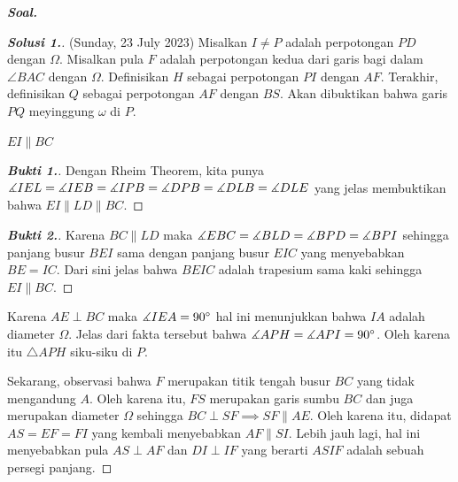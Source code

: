 \textbf{\textit{Soal. }}

\begin{proof}[\textbf{Solusi 1.}] (Sunday, 23 July 2023)
    Misalkan $I \neq P$ adalah perpotongan $PD$ dengan $\Omega$. Misalkan pula $F$ adalah perpotongan kedua dari garis bagi dalam $\angle BAC$ dengan $\Omega$. Definisikan $H$ sebagai perpotongan $PI$ dengan $AF$. Terakhir, definisikan $Q$ sebagai perpotongan $AF$ dengan $BS$. Akan dibuktikan bahwa garis $PQ$ meyinggung $\omega$ di $P$. 

    
    \begin{lemmarev}
        $EI \parallel BC$ 
        \begin{proof}[\textbf{Bukti 1.}] Dengan Rheim Theorem, kita punya $\measuredangle IEL = \measuredangle IEB = \measuredangle IPB = \measuredangle DPB = \measuredangle DLB = \measuredangle DLE$ yang jelas membuktikan bahwa $EI \parallel LD \parallel BC$.
        \end{proof}
        \begin{proof}[\textbf{Bukti 2.}] Karena $BC \parallel LD$ maka $\measuredangle EBC = \measuredangle BLD = \measuredangle BPD = \measuredangle BPI$ sehingga panjang busur $BEI$ sama dengan panjang busur $EIC$ yang menyebabkan $BE=IC$. Dari sini jelas bahwa $BEIC$ adalah trapesium sama kaki sehingga $EI \parallel BC$.
        \end{proof}
    \end{lemmarev}

    Karena $AE \perp BC$ maka $\measuredangle IEA = 90^\circ$ hal ini menunjukkan bahwa $IA$ adalah diameter $\Omega$. Jelas dari fakta tersebut bahwa $\measuredangle APH = \measuredangle API = 90^\circ$. Oleh karena itu $\triangle APH$ siku-siku di $P$. 

    Sekarang, observasi bahwa $F$ merupakan titik tengah busur $BC$ yang tidak mengandung $A$. Oleh karena itu, $FS$ merupakan garis sumbu $BC$ dan juga merupakan diameter $\Omega$ sehingga $BC \perp SF \implies SF \parallel AE$. Oleh karena itu, didapat $AS=EF=FI$ yang kembali menyebabkan $AF \parallel SI$. Lebih jauh lagi, hal ini menyebabkan pula $AS \perp AF$ dan $DI \perp IF$ yang berarti $ASIF$ adalah sebuah persegi panjang.


\end{proof}
